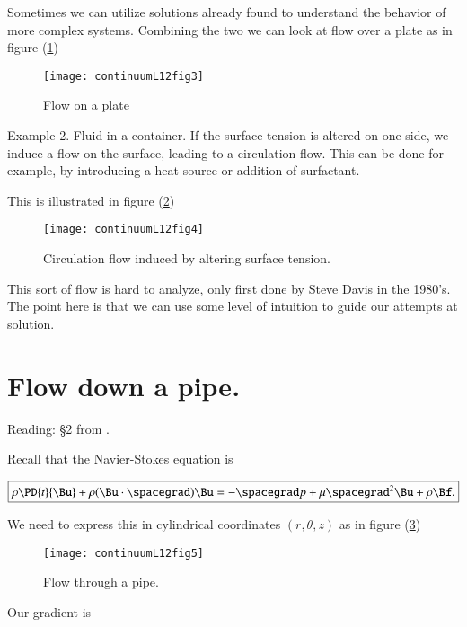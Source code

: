 Sometimes we can utilize solutions already found to understand the behavior of more complex systems.  Combining the two we can look at flow over a plate as in figure (\ref{fig:continuumL12:continuumL12fig3})

\begin{figure}[htp]
   \centering
   \texttt{[image: continuumL12fig3]}
   \caption{Flow on a plate}\label{fig:continuumL12:continuumL12fig3}
\end{figure}

Example 2.  Fluid in a container.  If the surface tension is altered on one side, we induce a flow on the surface, leading to a circulation flow.  This can be done for example, by introducing a heat source or addition of surfactant.

This is illustrated in figure (\ref{fig:continuumL12:continuumL12fig4})
\begin{figure}[htp]
   \centering
   \texttt{[image: continuumL12fig4]}
   \caption{Circulation flow induced by altering surface tension.}\label{fig:continuumL12:continuumL12fig4}
\end{figure}

This sort of flow is hard to analyze, only first done by Steve Davis in the 1980's.  The point here is that we can use some level of intuition to guide our attempts at solution.

\section{Flow down a pipe.}

Reading: \S 2 from \cite{acheson1990elementary}.

Recall that the Navier-Stokes equation is

\begin{equation}\label{eqn:continuumL12:570}
\boxed{
\rho \PD{t}{\Bu} + \rho (\Bu \cdot \spacegrad) \Bu = - \spacegrad p + \mu \spacegrad^2 \Bu + \rho \Bf.
}
\end{equation}

We need to express this in cylindrical coordinates $(r, \theta, z)$ as in figure (\ref{fig:continuumL12:continuumL12fig5})
\begin{figure}[htp]
   \centering
   \texttt{[image: continuumL12fig5]}
   \caption{Flow through a pipe.}\label{fig:continuumL12:continuumL12fig5}
\end{figure}

Our gradient is

